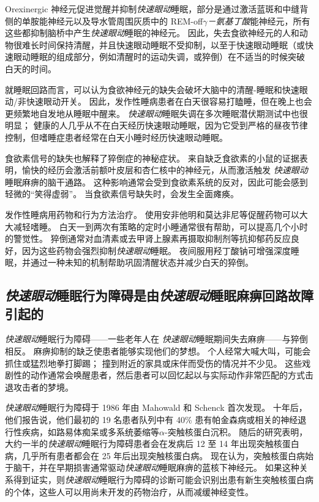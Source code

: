 Orexinergic 神经元促进觉醒并抑制\textit{快速眼动}睡眠，部分是通过激活蓝斑和中缝背侧的单胺能神经元以及导水管周围灰质中的 REM-off\textit{$\gamma$－氨基丁酸}能神经元，所有这些都抑制脑桥中产生\textit{快速眼动}睡眠的神经元。
因此，失去食欲神经元的人和动物很难长时间保持清醒，并且快速眼动睡眠不受抑制，以至于快速眼动睡眠（或快速眼动睡眠的组成部分，例如清醒时的运动失调，或猝倒）在不适当的时候突破 白天的时间。


就睡眠回路而言，可以认为食欲神经元的缺失会破坏大脑中的清醒-睡眠和快速眼动/非快速眼动开关。
因此，发作性睡病患者在白天很容易打瞌睡，但在晚上也会更频繁地自发地从睡眠中醒来。
\textit{快速眼动}睡眠失调在多次睡眠潜伏期测试中也很明显；
健康的人几乎从不在白天经历快速眼动睡眠，因为它受到严格的昼夜节律控制，但嗜睡症患者经常在白天小睡时经历快速眼动睡眠。


食欲素信号的缺失也解释了猝倒症的神秘症状。
来自缺乏食欲素的小鼠的证据表明，愉快的经历会激活前额叶皮层和杏仁核中的神经元，从而激活触发 \textit{快速眼动}睡眠麻痹的脑干通路。
这种影响通常会受到食欲素系统的反对，因此可能会感到轻微的“笑得虚弱”。
当食欲素信号缺失时，会发生全面瘫痪。


发作性睡病用药物和行为方法治疗。
使用安非他明和莫达非尼等促醒药物可以大大减轻嗜睡。
白天一到两次有策略的定时小睡通常很有帮助，可以提高几个小时的警觉性。
猝倒通常对血清素或去甲肾上腺素再摄取抑制剂等抗抑郁药反应良好，因为这些药物会强烈抑制\textit{快速眼动}睡眠。
夜间服用羟丁酸钠可增强深度睡眠，并通过一种未知的机制帮助巩固清醒状态并减少白天的猝倒。



\subsection{\textit{快速眼动}睡眠行为障碍是由\textit{快速眼动}睡眠麻痹回路故障引起的}

\textit{快速眼动}睡眠行为障碍——一些老年人在 \textit{快速眼动}睡眠期间失去麻痹——与猝倒相反。
麻痹抑制的缺乏使患者能够实现他们的梦想。
个人经常大喊大叫，可能会抓住或猛烈地拳打脚踢；
撞到附近的家具或床伴而受伤的情况并不少见。
这些戏剧性的动作通常会唤醒患者，然后患者可以回忆起以与实际动作非常匹配的方式击退攻击者的梦境。


\textit{快速眼动}睡眠行为障碍于 1986 年由 Mahowald 和 Schenck 首次发现。
十年后，他们报告说，他们最初的 19 名患者队列中有 40\% 患有帕金森病或相关的神经退行性疾病，如路易体痴呆或多系统萎缩等$ \alpha $-突触核蛋白沉积。
随后的研究表明，大约一半的\textit{快速眼动}睡眠行为障碍患者会在发病后 12 至 14 年出现突触核蛋白病，几乎所有患者都会在 25 年后出现突触核蛋白病。
现在认为，突触核蛋白病始于脑干，并在早期损害通常驱动\textit{快速眼动}睡眠麻痹的蓝核下神经元。
如果这种关系得到证实，则\textit{快速眼动}睡眠行为障碍的诊断可能会识别出患有新生突触核蛋白病的个体，这些人可以用尚未开发的药物治疗，从而减缓神经变性。



